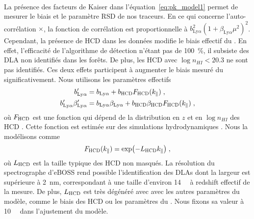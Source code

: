 \documentclass[11pt, twoside, a4paper, openright]{report}
\begin{document}
\paragraph{}
La présence des facteurs de Kaiser dans l'équation~\ref{eq:pk_model1} permet de mesurer le biais et le paramètre RSD de nos traceurs. En ce qui concerne l'auto-corrélation \lya{}$\times$\lya{}, la fonction de corrélation est proportionnelle à $b_{\mathrm{Ly}\alpha}^2(1+\beta_{\mathrm{Ly}\alpha} \mu^2)^2$. Cependant, la présence de HCD dans les données modifie le biais effectif du \lya{}. En effet, l'efficacité de l'algorithme de détection n'étant pas de \SI{100}{\percent}, il subsiste des DLA non identifiés dans les forêts. De plus, les HCD avec $\log n_{HI} < 20.3$ ne sont pas identifiés. Ces deux effets participent à augmenter le biais mesuré du \lya{} significativement. Nous utilisons les paramètres effectifs
\begin{align}
  b_{\mathrm{Ly}\alpha}' &= b_{\mathrm{Ly}\alpha} + b_{\textsc{HCD}} F_{\textsc{HCD}}(k_{\parallel}{}) \; , \\
  b_{\mathrm{Ly}\alpha}' \beta_{\mathrm{Ly}\alpha}' &= b_{\mathrm{Ly}\alpha} \beta_{\mathrm{Ly}\alpha} + b_{\textsc{HCD}} \beta_{\textsc{HCD}} F_{\textsc{HCD}}(k_{\parallel}{})  \; ,
\end{align}
où $F_{\textsc{HCD}}$ est une fonction qui dépend de la distribution en $z$ et en $\log n_{HI}$ des HCD \citep{font-ribera_effect_2012}. Cette fonction est estimée sur des simulations hydrodynamiques \citep{Rogers2017}. Nous la modélisons comme
\begin{equation}
  F_{\textsc{HCD}}(k_{\parallel}{}) = \exp(- L_{\textsc{HCD}} k_{\parallel}{}) \; ,
\end{equation}
où $L_{\textsc{HCD}}$ est la taille typique des HCD non masqués. La résolution du spectrographe d'eBOSS rend possible l'identification des DLAs dont la largeur est supérieure à \SI{2}{\nano\meter}, correspondant à une taille d'environ \SI{14}{\perh\Mpc} à redshift effectif de la mesure. De plus, $L_{\textsc{HCD}}$ est très dégénéré avec avec les autres paramètres du modèle, comme le biais des HCD ou les paramètres du \lya{}. Nous fixons sa valeur à \SI{10}{\perh\Mpc} dans l'ajustement du modèle.
\end{document}
